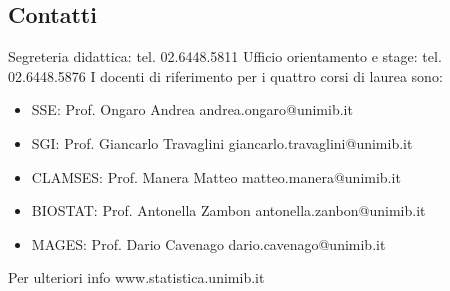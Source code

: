 \subsection{Contatti}
Segreteria didattica: tel. 02.6448.5811
Ufficio orientamento e stage: tel. 02.6448.5876
I docenti di riferimento per i quattro corsi di laurea sono: 
\begin{itemize}
   \item SSE: Prof. Ongaro Andrea andrea.ongaro@unimib.it 
   \item SGI: Prof. Giancarlo Travaglini giancarlo.travaglini@unimib.it 
   \item CLAMSES: Prof. Manera Matteo matteo.manera@unimib.it 
   \item BIOSTAT: Prof. Antonella Zambon antonella.zanbon@unimib.it 
   \item MAGES: Prof. Dario Cavenago dario.cavenago@unimib.it
\end{itemize}
Per ulteriori info www.statistica.unimib.it 
